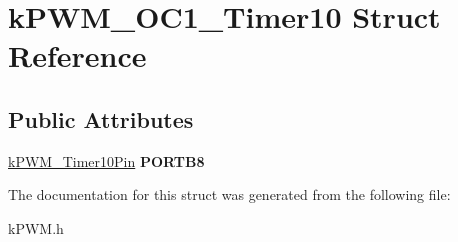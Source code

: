 \hypertarget{structkPWM__OC1__Timer10}{}\section{k\+P\+W\+M\+\_\+\+O\+C1\+\_\+\+Timer10 Struct Reference}
\label{structkPWM__OC1__Timer10}
\subsection*{Public Attributes}
\begin{DoxyCompactItemize}
\item 
\hyperlink{structkPWM__Timer10Pin}{k\+P\+W\+M\+\_\+\+Timer10\+Pin} {\bfseries P\+O\+R\+T\+B8}\hypertarget{structkPWM__OC1__Timer10_a60f35bb5d9228eac17ee7c2b7f4cd118}{}\label{structkPWM__OC1__Timer10_a60f35bb5d9228eac17ee7c2b7f4cd118}

\end{DoxyCompactItemize}


The documentation for this struct was generated from the following file\+:\begin{DoxyCompactItemize}
\item 
k\+P\+W\+M.\+h\end{DoxyCompactItemize}
